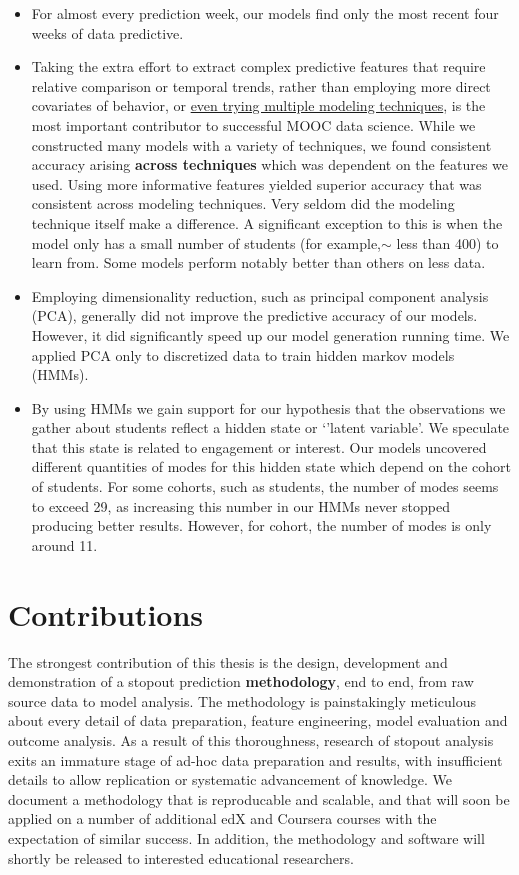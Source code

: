 \begin{itemize}
\item For almost every prediction week, our models find only the most recent four weeks of data predictive.

\item Taking the extra effort to extract complex predictive features that require relative comparison or temporal trends, rather than employing more direct covariates of behavior, or \underline{even trying multiple modeling techniques}, is the most important contributor to successful MOOC data science. While we constructed many models with a variety of techniques, we found consistent accuracy arising \textbf{across techniques} which was dependent on the features we used. Using more informative features yielded superior accuracy that was consistent across modeling techniques. Very seldom did the modeling technique itself make a difference. A significant exception to this is when the model only has a small number of students (for example,$\sim$ less than 400) to learn from. Some models perform notably better than others on less data.

\item Employing dimensionality reduction, such as principal component analysis (PCA), generally did not improve the predictive accuracy of our models. However, it did significantly speed up our model generation running time. We applied PCA only to discretized data to train hidden markov models (HMMs).

\item By using HMMs we gain support for our hypothesis that the observations we gather about students reflect a hidden state or `'latent variable'. We speculate that this state is related to engagement or interest. Our models uncovered different quantities of modes for this hidden state which depend on the cohort of students. For some cohorts, such as \neither students, the number of modes seems to exceed 29, as increasing this number in our HMMs never stopped producing better results. However, for \forum cohort, the number of modes is only around 11.
\end{itemize}

\section{Contributions}

The strongest contribution of this thesis is the design, development and demonstration of a stopout prediction \textbf{methodology}, end to end, from raw source data to model analysis. The methodology is painstakingly meticulous about every detail of data preparation, feature engineering, model evaluation and outcome analysis. As a result of this thoroughness, research of stopout analysis exits an immature stage of ad-hoc data preparation and results, with insufficient details to allow replication or systematic advancement of knowledge. We document a methodology that is reproducable and scalable, and that will soon be applied on a number of additional edX and Coursera courses with the expectation of similar success. In addition, the methodology and software will shortly be released to interested educational researchers.

